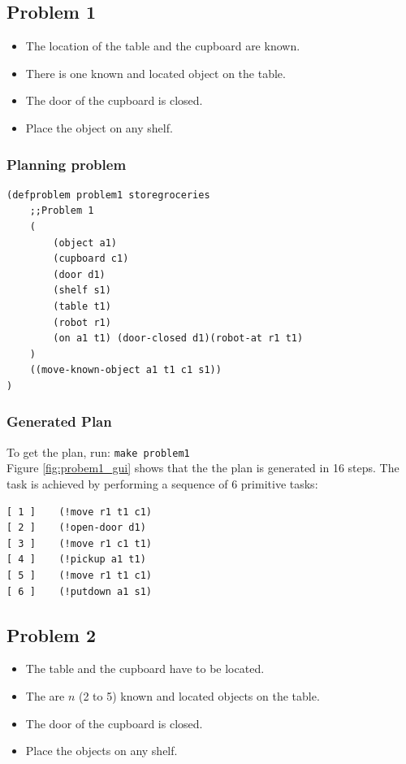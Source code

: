 \documentclass[paper=a4, fontsize=11pt]{scrartcl}
\begin{document}
	\subsection{Problem 1}
	
	\begin{itemize}
		\item The location of the table and the cupboard are known.
		\item There is one known and located object on the table.
		\item The door of the cupboard is closed.
		\item Place the object on any shelf.
	\end{itemize}
	
	\newpage
	
	\subsubsection*{Planning problem}
	
	\begin{lstlisting}
(defproblem problem1 storegroceries
	;;Problem 1
	(
		(object a1)
		(cupboard c1)
		(door d1)
		(shelf s1)
		(table t1)
		(robot r1)
		(on a1 t1) (door-closed d1)(robot-at r1 t1)
	)
	((move-known-object a1 t1 c1 s1))
)
	\end{lstlisting}
	
	\subsubsection*{Generated Plan}
	
	To get the plan, run: \verb|make problem1| \\
	
	Figure \ref{fig:probem1_gui} shows that the the plan is generated in 16 steps. The task is achieved by performing a sequence of 6 primitive tasks: \\
	
	\begin{lstlisting}
[ 1 ]    (!move r1 t1 c1)
[ 2 ]    (!open-door d1)
[ 3 ]    (!move r1 c1 t1)
[ 4 ]    (!pickup a1 t1)
[ 5 ]    (!move r1 t1 c1)
[ 6 ]    (!putdown a1 s1)
	\end{lstlisting}
	
	\subsection{Problem 2}
	
	\begin{itemize}
		\item The table and the cupboard have to be located.
		\item The are $n$ (2 to 5) known and located objects on the table.
		\item The door of the cupboard is closed.
		\item Place the objects on any shelf.
	\end{itemize}
	
\end{document}
